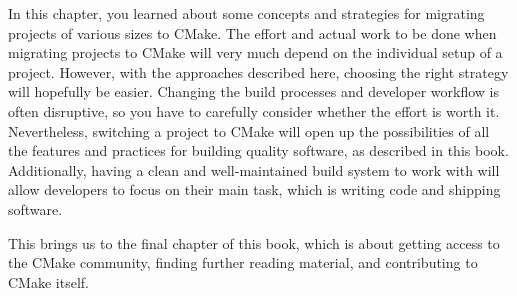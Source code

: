 
In this chapter, you learned about some concepts and strategies for migrating projects of various sizes to CMake. The effort and actual work to be done when migrating projects to CMake will very much depend on the individual setup of a project. However, with the approaches described here, choosing the right strategy will hopefully be easier. Changing the build processes and developer workflow is often disruptive, so you have to carefully consider whether the effort is worth it. Nevertheless, switching a project to CMake will open up the possibilities of all the features and practices for building quality software, as described in this book. Additionally, having a clean and well-maintained build system to work with will allow developers to focus on their main task, which is writing code and shipping software.

This brings us to the final chapter of this book, which is about getting access to the CMake community, finding further reading material, and contributing to CMake itself.